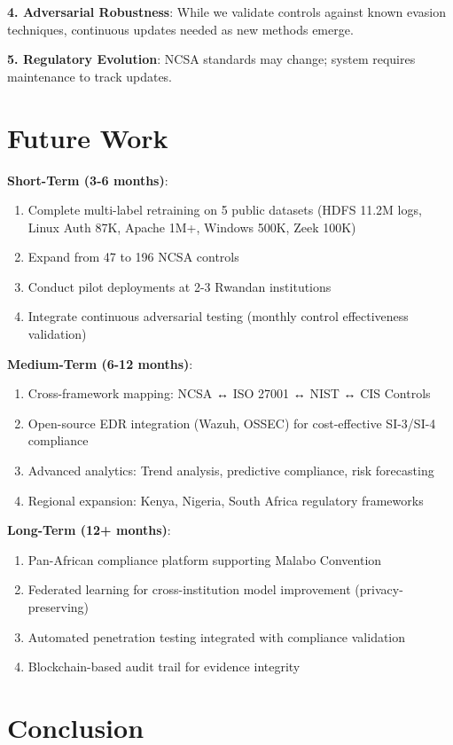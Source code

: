 \documentclass[11pt,conference]{IEEEtran}
\begin{document}
\textbf{4. Adversarial Robustness}: While we validate controls against known evasion techniques, continuous updates needed as new methods emerge.

\textbf{5. Regulatory Evolution}: NCSA standards may change; system requires maintenance to track updates.

\section{Future Work}

\textbf{Short-Term (3-6 months)}:
\begin{enumerate}
    \item Complete multi-label retraining on 5 public datasets (HDFS 11.2M logs, Linux Auth 87K, Apache 1M+, Windows 500K, Zeek 100K)
    \item Expand from 47 to 196 NCSA controls
    \item Conduct pilot deployments at 2-3 Rwandan institutions
    \item Integrate continuous adversarial testing (monthly control effectiveness validation)
\end{enumerate}

\textbf{Medium-Term (6-12 months)}:
\begin{enumerate}
    \item Cross-framework mapping: NCSA ↔ ISO 27001 ↔ NIST ↔ CIS Controls
    \item Open-source EDR integration (Wazuh, OSSEC) for cost-effective SI-3/SI-4 compliance
    \item Advanced analytics: Trend analysis, predictive compliance, risk forecasting
    \item Regional expansion: Kenya, Nigeria, South Africa regulatory frameworks
\end{enumerate}

\textbf{Long-Term (12+ months)}:
\begin{enumerate}
    \item Pan-African compliance platform supporting Malabo Convention
    \item Federated learning for cross-institution model improvement (privacy-preserving)
    \item Automated penetration testing integrated with compliance validation
    \item Blockchain-based audit trail for evidence integrity
\end{enumerate}

\section{Conclusion}
\end{document}
